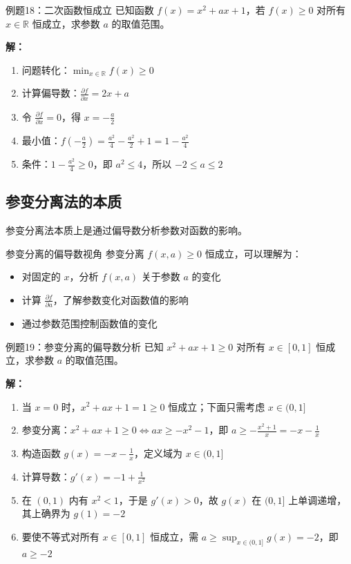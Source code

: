 \documentclass[a4paper,11pt]{ctexart}
\newcommand{\partialder}[2]{\frac{\partial #1}{\partial #2}}
\theoremstyle{definition}
\theoremstyle{remark}
\begin{document}
\begin{examplebox}{例题18：二次函数恒成立}
已知函数 $f(x) = x^2 + ax + 1$，若 $f(x) \geq 0$ 对所有 $x \in \mathbb{R}$ 恒成立，求参数 $a$ 的取值范围。

\textbf{解：}
\begin{enumerate}
    \item 问题转化：$\min_{x \in \mathbb{R}} f(x) \geq 0$
    \item 计算偏导数：$\partialder{f}{x} = 2x + a$
    \item 令 $\partialder{f}{x} = 0$，得 $x = -\frac{a}{2}$
    \item 最小值：$f(-\frac{a}{2}) = \frac{a^2}{4} - \frac{a^2}{2} + 1 = 1 - \frac{a^2}{4}$
    \item 条件：$1 - \frac{a^2}{4} \geq 0$，即 $a^2 \leq 4$，所以 $-2 \leq a \leq 2$
\end{enumerate}
\end{examplebox}

\subsection{参变分离法的本质}

参变分离法本质上是通过偏导数分析参数对函数的影响。

\begin{conceptbox}{参变分离的偏导数视角}
参变分离 $f(x,a) \geq 0$ 恒成立，可以理解为：
\begin{itemize}
    \item 对固定的 $x$，分析 $f(x,a)$ 关于参数 $a$ 的变化
    \item 计算 $\partialder{f}{a}$，了解参数变化对函数值的影响
    \item 通过参数范围控制函数值的变化
\end{itemize}
\end{conceptbox}

\begin{examplebox}{例题19：参变分离的偏导数分析}
已知 $x^2 + ax + 1 \geq 0$ 对所有 $x \in [0,1]$ 恒成立，求参数 $a$ 的取值范围。

\textbf{解：}
\begin{enumerate}
    \item 当 $x = 0$ 时，$x^2 + ax + 1 = 1 \geq 0$ 恒成立；下面只需考虑 $x \in (0,1]$
    \item 参变分离：$x^2 + ax + 1 \geq 0 \Leftrightarrow ax \geq -x^2 - 1$，即 $a \geq -\frac{x^2 + 1}{x} = -x - \frac{1}{x}$
    \item 构造函数 $g(x) = -x - \frac{1}{x}$，定义域为 $x \in (0,1]$
    \item 计算导数：$g'(x) = -1 + \frac{1}{x^2}$
    \item 在 $(0,1)$ 内有 $x^2 < 1$，于是 $g'(x) > 0$，故 $g(x)$ 在 $(0,1]$ 上单调递增，其上确界为 $g(1) = -2$
    \item 要使不等式对所有 $x \in [0,1]$ 恒成立，需 $a \geq \sup_{x \in (0,1]} g(x) = -2$，即 $a \geq -2$
\end{enumerate}
\end{examplebox}
\end{document}
